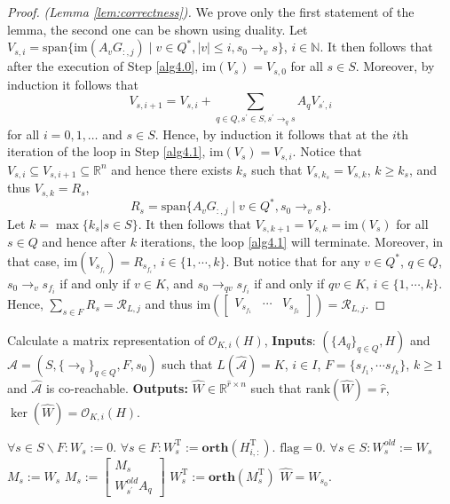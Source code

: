 \documentclass[journal]{IEEEtran}
\newcommand{\IM}{\mathrm{im}}
\newcommand{\Rank}{\mathrm{rank}}
\newcommand{\SPAN}{\mathrm{span}}
\begin{document}
\begin{proof}\emph{(Lemma \ref{lem:correctness}).}
	We prove only the first statement of the lemma, the second one can be shown using duality. Let $V_{s,i}=\SPAN\{ \IM (A_vG_{:,j}) \mid v \in Q^*, |v| \le i, s_0 \rightarrow_v s\}$, $i \in \mathbb{N}$. It then follows that after the execution of Step \ref{alg4.0}, $\IM (V_s)=V_{s,0}$ for all $s \in S$. Moreover, by induction it follows that
	\[
	V_{s,i+1}=V_{s,i} + \sum_{q \in Q, s^{'} \in S, s^{'} \rightarrow_q s} A_qV_{s^{'},i}
	\]
	for all $i=0,1,\ldots$ and $s \in S$. Hence, by induction it follows that at the $i$th iteration of the loop in Step \ref{alg4.1}, $\IM (V_s)=V_{s,i}$. Notice that $V_{s,i} \subseteq V_{s,i+1} \subseteq \mathbb{R}^n$ and hence there exists $k_s$ such that $V_{s,k_s}=V_{s,k}$, $k \ge k_s$, and thus $V_{s,k}=R_s$,
	\[
	R_s=\SPAN\{  A_vG_{:,j} \mid v \in Q^{*}, s_0 \rightarrow_v s \}.
	\]
	Let $k= \max \{k_s |  s \in S\}$. It then follows that $V_{s,k+1}=V_{s,k}=\IM (V_s)$ for all $s \in Q$ and hence after $k$ iterations, the loop \ref{alg4.1} will terminate. Moreover, in that case,  $\IM (V_{s_{f_i}})=R_{s_{f_i}}$, $i \in \{1,\cdots,k\}$. But notice that for any $v \in Q^*$, $q \in Q$, $s_0 \rightarrow_v s_{f_i}$ if and only if $v \in K$, and $s_0 \rightarrow_{qv} s_{f_i}$ if and only if $qv \in K$, $i \in \{1,\cdots,k\}$. Hence, $\sum\limits_{s \in F}^{}R_s=\mathscr{R}_{L,j}$ and thus $\IM \left( \left[ \begin{array}{ccc} V_{s_{f_1}} & \cdots & V_{s_{f_k}} \end{array} \right] \right)=\mathscr{R}_{L,j}$.
\end{proof}

\begin{algorithm}
	\caption{
		Calculate a matrix representation of $\mathscr{O}_{K,i}(H)$, 
		\newline
		\textbf{Inputs}: $(\{A_q\}_{q \in Q},H)$ and $\hat{\mathcal{A}}=(S,\{\rightarrow_q \}_{q \in Q},F,s_0)$ such that $L(\hat{\mathcal{A}})=K$, $i \in I$, $F=\{s_{f_1},\cdots s_{f_k}\}$, $k \geq 1$ and $\hat{\mathcal{A}}$  is co-reachable.
		\newline
		\textbf{Outputs:} $\hat{W}  \in \mathbb{R}^{\hat{r} \times n}$ such that $\Rank(\hat{W})=\hat{r}$,
		$\ker(\hat{W}) = \mathscr{O}_{K,i}(H)$.
	}
	\label{alg5}
	\begin{algorithmic}[1]
		\STATE $\forall s \in S \backslash F: W_s:=0$.
		\STATE $\forall s \in F: W_{s}^{\mathrm{T}}:=\mathbf{orth}(H_{i,:}^{\mathrm{T}})$.
		\STATE $\mathrm{flag}=0$.
\label{alg2.0}
		\label{alg2.1}
		\STATE $\forall s \in S: W_s^{old} := W_s$
		\STATE  $M_s:=W_s$
		\STATE $M_s:=\begin{bmatrix} M_s \\ W^{old}_{s^{'}}A_q \end{bmatrix}$
		\ENDFOR
		\STATE $W_s^{\mathrm{T}} := \mathbf{orth}(M_s^{\mathrm{T}})$
		\ENDFOR
		\IF{$\forall s \in S: \Rank (W_s) = \Rank (W^{old}_s)$}
		\ENDIF
		\ENDWHILE
		\RETURN $\hat{W}=W_{s_0}$.
	\end{algorithmic}
\end{algorithm}
\end{document}
